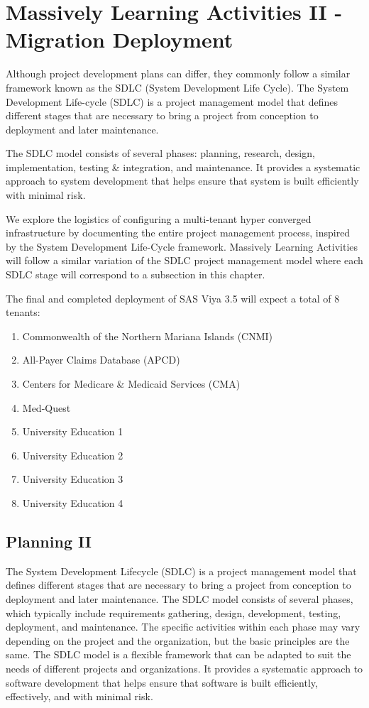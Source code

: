 \section{Massively Learning Activities II - Migration Deployment} \label{section: MLA2}
Although project development plans can differ, they commonly follow a similar framework known as the SDLC (System Development Life Cycle). The System Development Life-cycle (SDLC) is a project management model that defines different stages that are necessary to bring a project from conception to deployment and later maintenance. 

The SDLC model consists of several phases: planning, research, design, implementation, testing \& integration, and maintenance. It provides a systematic approach to system development that helps ensure that system is built efficiently with minimal risk.

We explore the logistics of configuring a multi-tenant hyper converged infrastructure by documenting the entire project management process, inspired by the System Development Life-Cycle framework.  Massively Learning Activities will follow a similar variation of the SDLC project management model where each SDLC stage will correspond to a subsection in this chapter. 

The final and completed deployment of SAS Viya 3.5 will expect a total of 8 tenants:

\begin{enumerate}
    \item Commonwealth of the Northern Mariana Islands (CNMI)
    \item All-Payer Claims Database (APCD)
    \item Centers for Medicare \& Medicaid Services (CMA)
    \item Med-Quest
    \item University Education 1
    \item University Education 2
    \item University Education 3
    \item University Education 4
\end{enumerate}

\subsection{Planning II}

The System Development Lifecycle (SDLC) is a project management model that defines different stages that are necessary to bring a project from conception to deployment and later maintenance. The SDLC model consists of several phases, which typically include requirements gathering, design, development, testing, deployment, and maintenance. The specific activities within each phase may vary depending on the project and the organization, but the basic principles are the same. The SDLC model is a flexible framework that can be adapted to suit the needs of different projects and organizations. It provides a systematic approach to software development that helps ensure that software is built efficiently, effectively, and with minimal risk.

